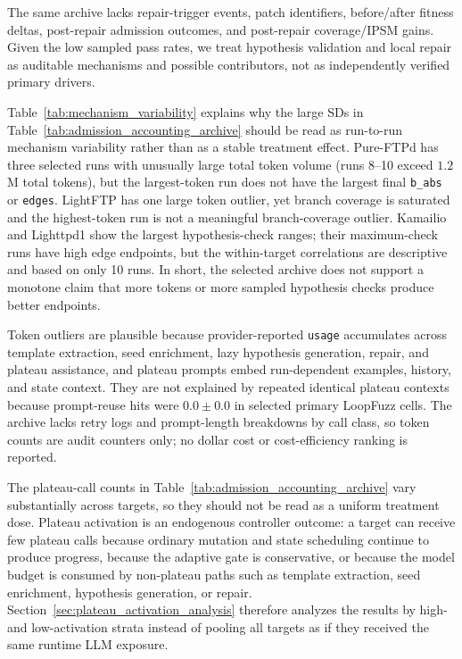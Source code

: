 \documentclass[final,5p,times,number]{elsarticle}
\begin{document}
The same archive lacks repair-trigger events, patch identifiers, before/after fitness deltas, post-repair admission outcomes, and post-repair coverage/IPSM gains. Given the low sampled pass rates, we treat hypothesis validation and local repair as auditable mechanisms and possible contributors, not as independently verified primary drivers.

Table~\ref{tab:mechanism_variability} explains why the large SDs in Table~\ref{tab:admission_accounting_archive} should be read as run-to-run mechanism variability rather than as a stable treatment effect. Pure-FTPd has three selected runs with unusually large total token volume (runs 8--10 exceed $1.2$M total tokens), but the largest-token run does not have the largest final \texttt{b\_abs} or \texttt{edges}. LightFTP has one large token outlier, yet branch coverage is saturated and the highest-token run is not a meaningful branch-coverage outlier. Kamailio and Lighttpd1 show the largest hypothesis-check ranges; their maximum-check runs have high edge endpoints, but the within-target correlations are descriptive and based on only 10 runs. In short, the selected archive does not support a monotone claim that more tokens or more sampled hypothesis checks produce better endpoints.

Token outliers are plausible because provider-reported \texttt{usage} accumulates across template extraction, seed enrichment, lazy hypothesis generation, repair, and plateau assistance, and plateau prompts embed run-dependent examples, history, and state context. They are not explained by repeated identical plateau contexts because prompt-reuse hits were $0.0{\pm}0.0$ in selected primary LoopFuzz cells. The archive lacks retry logs and prompt-length breakdowns by call class, so token counts are audit counters only; no dollar cost or cost-efficiency ranking is reported.

The plateau-call counts in Table~\ref{tab:admission_accounting_archive} vary substantially across targets, so they should not be read as a uniform treatment dose. Plateau activation is an endogenous controller outcome: a target can receive few plateau calls because ordinary mutation and state scheduling continue to produce progress, because the adaptive gate is conservative, or because the model budget is consumed by non-plateau paths such as template extraction, seed enrichment, hypothesis generation, or repair. Section~\ref{sec:plateau_activation_analysis} therefore analyzes the results by high- and low-activation strata instead of pooling all targets as if they received the same runtime LLM exposure.
\end{document}
